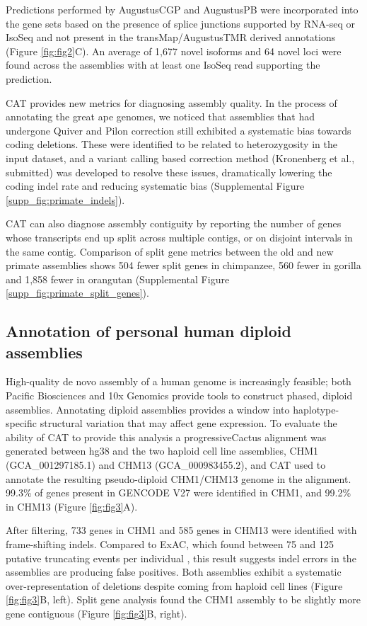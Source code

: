 \documentclass[fleqn,10pt]{wlscirep}
\begin{document}
Predictions performed by AugustusCGP and AugustusPB were incorporated into the gene sets based on the presence of splice junctions supported by RNA-seq or IsoSeq and not present in the transMap/AugustusTMR derived annotations (Figure \ref{fig:fig2}C). An average of 1,677 novel isoforms and 64 novel loci were found across the assemblies with at least one IsoSeq read supporting the prediction.

CAT provides new metrics for diagnosing assembly quality. In the process of annotating the great ape genomes, we noticed that assemblies that had undergone Quiver and Pilon \cite{walker2014pilon} correction still exhibited a systematic bias towards coding deletions. These were identified to be related to heterozygosity in the input dataset, and a variant calling based correction method (Kronenberg et al., submitted) was developed to resolve these issues, dramatically lowering the coding indel rate and reducing systematic bias (Supplemental Figure \ref{supp_fig:primate_indels}).

CAT can also diagnose assembly contiguity by reporting the number of genes whose transcripts end up split across multiple contigs, or on disjoint intervals in the same contig. Comparison of split gene metrics between the old and new primate assemblies shows 504 fewer split genes in chimpanzee, 560 fewer in gorilla and 1,858 fewer in orangutan (Supplemental Figure \ref{supp_fig:primate_split_genes}).


\subsection*{Annotation of personal human diploid assemblies}
High-quality de novo assembly of a human genome is increasingly feasible; both Pacific Biosciences \cite{chin2016phased,huddleston2016discovery,korlach2017novo} and 10x Genomics \cite{Weisenfeld070425} provide tools to construct phased, diploid assemblies. Annotating diploid assemblies provides a window into haplotype-specific structural variation that may affect gene expression. To evaluate the ability of CAT to provide this analysis a progressiveCactus alignment was generated between hg38 and the two haploid cell line assemblies, CHM1 (GCA\_001297185.1) and CHM13 (GCA\_000983455.2), and CAT used to annotate the resulting pseudo-diploid CHM1/CHM13 genome in the alignment. 99.3\% of genes present in GENCODE V27 were identified in CHM1, and 99.2\% in CHM13 (Figure \ref{fig:fig3}A). 
    
	After filtering, 733 genes in CHM1 and 585 genes in CHM13 were identified with frame-shifting indels. Compared to ExAC, which found between 75 and 125 putative truncating events per individual \cite{karczewski2016exac}, this result suggests indel errors in the assemblies are producing false positives. Both assemblies exhibit a systematic over-representation of deletions despite coming from haploid cell lines (Figure \ref{fig:fig3}B, left). Split gene analysis found the CHM1 assembly to be slightly more gene contiguous (Figure \ref{fig:fig3}B, right).
\end{document}
